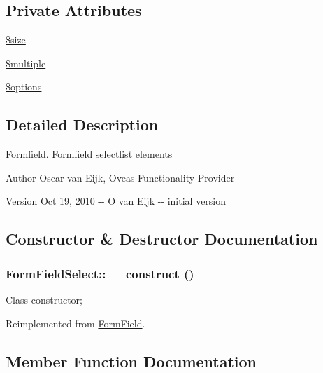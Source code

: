 \subsection*{Private Attributes}
\begin{DoxyCompactItemize}
\item 
\hyperlink{classFormFieldSelect_a8e79d63b2f69dc06959f3f0dc6f0a12a}{\$size}
\item 
\hyperlink{classFormFieldSelect_a6eb8f177d1cfd20845509c0a35120725}{\$multiple}
\item 
\hyperlink{classFormFieldSelect_a5c4b74ae8d7274e642e78e5a514c9736}{\$options}
\end{DoxyCompactItemize}


\subsection{Detailed Description}
Formfield. Formfield selectlist elements \begin{DoxyAuthor}{Author}
Oscar van Eijk, Oveas Functionality Provider 
\end{DoxyAuthor}
\begin{DoxyVersion}{Version}
Oct 19, 2010 -\/-\/ O van Eijk -\/-\/ initial version 
\end{DoxyVersion}


\subsection{Constructor \& Destructor Documentation}
\subsubsection[{\_\-\_\-construct}]{\setlength{\rightskip}{0pt plus 5cm}FormFieldSelect::\_\-\_\-construct ()}\label{classFormFieldSelect_a32c59192be8c316fb2f7e1edde8f0a98}
Class constructor; 

Reimplemented from \hyperlink{classFormField_a0cfe713ce28a6a0cb53476ed463e1f01}{FormField}.



\subsection{Member Function Documentation}
